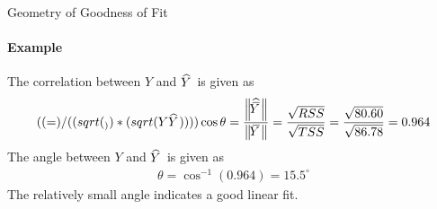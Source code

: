 %
%
%
%
%
%
%
\begin{frame}{Geometry of Goodness of Fit}
	\framesubtitle{Example}
	The correlation between
    $Y$ and $\hY$ is given as
    \begin{align*}
        \rho_{Y\hY} = \cos\theta =
        \frac{\norm{\hmY}}{\norm{\mY}} =
        \frac{\sqrt{RSS}}{\sqrt{TSS}}  =
        \frac{\sqrt{80.60}}{\sqrt{86.78}} = 0.964
    \end{align*}
    The angle between $Y$ and $\hY$ is given as
    \begin{align*}
        \theta = \cos^{-1}(0.964) = 15.5^\circ
    \end{align*}
    The relatively small angle indicates a good linear fit.
\end{frame}

